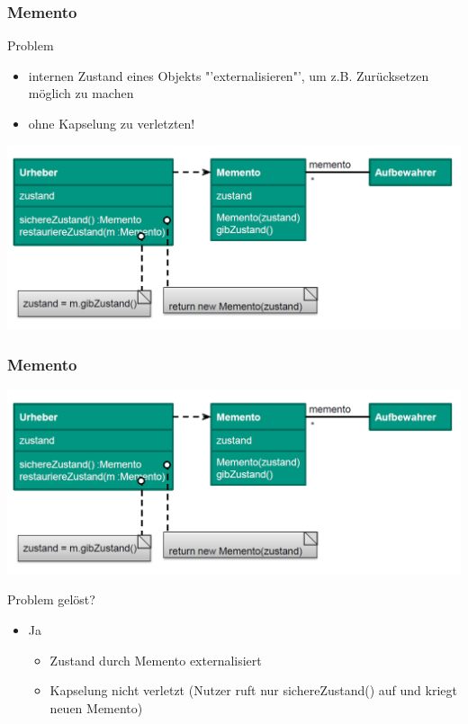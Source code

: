 \documentclass[18pt]{beamer}
\begin{document}
	\begin{frame}
		\frametitle{Memento}
		\begin{block}{Problem}
			\begin{itemize}
				\item internen Zustand eines Objekts "'externalisieren"', um z.B. Zurücksetzen möglich zu machen \pause 
				\item ohne Kapselung zu verletzten!
			\end{itemize}
		\end{block}
		\pause
		\centering
		\includegraphics[scale=0.4]{./pics/tut4/mem.png}
	\end{frame}

	\begin{frame}
		\frametitle{Memento}
		\includegraphics[scale=0.4]{./pics/tut4/mem.png}
		\begin{block}{Problem gelöst?}
			\begin{itemize}
				\pause
				\item Ja
				\begin{itemize}
					\pause
					\item Zustand durch Memento externalisiert \pause
					\item Kapselung nicht verletzt (Nutzer ruft nur sichereZustand() auf und kriegt neuen Memento)
				\end{itemize}
			\end{itemize}
		\end{block}
\end{frame}
\end{document}

